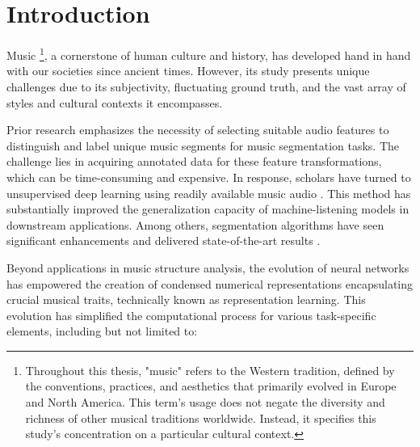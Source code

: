 \chapter{Introduction}

Music \footnote{Throughout this thesis, "music" refers to the Western tradition, defined by the conventions, practices, and aesthetics that primarily evolved in Europe and North America. This term's usage does not negate the diversity and richness of other musical traditions worldwide. Instead, it specifies this study's concentration on a particular cultural context.}, a cornerstone of human culture and history, has developed hand in hand with our societies since ancient times. However, its study presents unique challenges due to its subjectivity, fluctuating ground truth, and the vast array of styles and cultural contexts it encompasses.

Prior research emphasizes the necessity of selecting suitable audio features to distinguish and label unique music segments for music segmentation tasks. The challenge lies in acquiring annotated data for these feature transformations, which can be time-consuming and expensive. In response, scholars have turned to unsupervised deep learning using readily available music audio \cite{deepfeaturesegment, Grill2015MusicAnnotations}. This method has substantially improved the generalization capacity of machine-listening models in downstream applications. Among others, segmentation algorithms have seen significant enhancements and delivered state-of-the-art results \cite{Hernandez-Olivan2021MusicFeatures, Li2023MERT:Training}.

Beyond applications in music structure analysis, the evolution of neural networks has empowered the creation of condensed numerical representations encapsulating crucial musical traits, technically known as representation learning. This evolution has simplified the computational process for various task-specific elements, including but not limited to:

